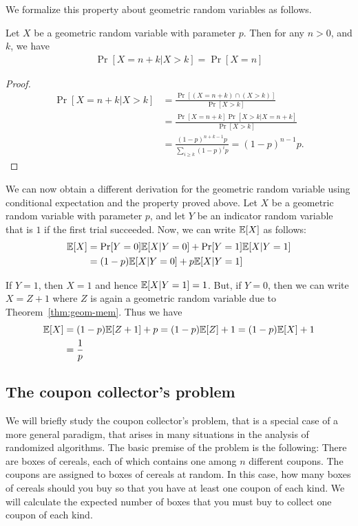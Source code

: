 We formalize this property about geometric random variables as follows.
\begin{theorem}
	Let $X$ be a geometric random variable with parameter $p$. Then for any $n>0$, and $k$, we have
	\begin{align*}
		\Pr[X = n+k | X > k] = \Pr[X=n]
	\end{align*}
	\label{thm:geom-mem}
\end{theorem}
\begin{proof}
	\begin{align*}
		\Pr[X = n+k | X > k] &= \frac{\Pr[(X=n+k) \cap (X>k)]}{\Pr[X>k]}\\
		&= \frac{\Pr[X=n+k]\Pr[X>k | X=n+k]}{\Pr[X>k]}\\
		&= \frac{(1-p)^{n+k-1}p}{\sum_{i\geq k}(1-p)^ip} = (1-p)^{n-1}p.
	\end{align*}
\end{proof}

We can now obtain a different derivation for the geometric random variable using conditional expectation and the property proved above. Let $X$ be a geometric random variable with parameter $p$, and let $Y$ be an indicator random variable that is $1$ if the first trial succeeded. Now, we can write $\mathbb{E}[X]$ as follows:
\begin{align*}
	\mathbb{E}[X] &= \Pr[Y=0]\mathbb{E}[X|Y=0] + \Pr[Y=1]\mathbb{E}[X|Y=1]\\
	&= (1-p)\mathbb{E}[X|Y=0] + p\mathbb{E}[X|Y=1]
\end{align*}

If $Y=1$, then $X=1$ and hence $\mathbb{E}[X|Y=1] =1$. But, if $Y=0$, then we can write $X = Z+1$ where $Z$ is again a geometric random variable due to Theorem~\ref{thm:geom-mem}. Thus we have
\begin{align*}
	\mathbb{E}[X] &= (1-p)\mathbb{E}[Z+1] + p = (1-p)\mathbb{E}[Z] + 1 = (1-p)\mathbb{E}[X] +1\\
	&=\frac{1}{p}
\end{align*}

\subsection{The coupon collector's problem}

We will briefly study the coupon collector's problem, that is a special case of a more general paradigm, that arises in many situations in the analysis of randomized algorithms. The basic premise of the problem is the following: There are boxes of cereals, each of which contains one among $n$ different coupons. The coupons are assigned to boxes of cereals at random. In this case, how many boxes of cereals should you buy so that you have at least one coupon of each kind. We will calculate the expected number of boxes that you must buy to collect one coupon of each kind.

